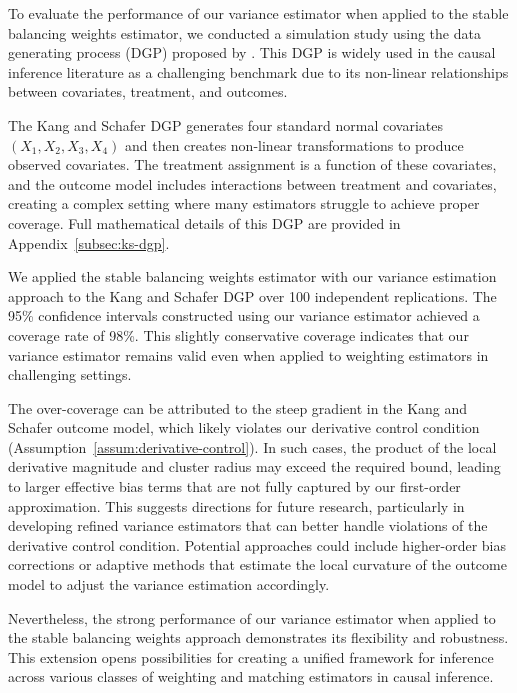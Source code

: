 \documentclass{mytemplate}
\begin{document}
To evaluate the performance of our variance estimator when applied to the stable balancing weights estimator, we conducted a simulation study using the data generating process (DGP) proposed by \cite{kang2007demystifying}. This DGP is widely used in the causal inference literature as a challenging benchmark due to its non-linear relationships between covariates, treatment, and outcomes.

The Kang and Schafer DGP generates four standard normal covariates $(X_1, X_2, X_3, X_4)$ and then creates non-linear transformations to produce observed covariates. The treatment assignment is a function of these covariates, and the outcome model includes interactions between treatment and covariates, creating a complex setting where many estimators struggle to achieve proper coverage. Full mathematical details of this DGP are provided in Appendix~\ref{subsec:ks-dgp}.


We applied the stable balancing weights estimator with our variance estimation approach to the Kang and Schafer DGP over 100 independent replications. The 95\% confidence intervals constructed using our variance estimator achieved a coverage rate of 98\%. This slightly conservative coverage indicates that our variance estimator remains valid even when applied to weighting estimators in challenging settings.

The over-coverage can be attributed to the steep gradient in the Kang and Schafer outcome model, which likely violates our derivative control condition (Assumption~\ref{assum:derivative-control}). In such cases, the product of the local derivative magnitude and cluster radius may exceed the required bound, leading to larger effective bias terms that are not fully captured by our first-order approximation. This suggests directions for future research, particularly in developing refined variance estimators that can better handle violations of the derivative control condition. Potential approaches could include higher-order bias corrections or adaptive methods that estimate the local curvature of the outcome model to adjust the variance estimation accordingly.

Nevertheless, the strong performance of our variance estimator when applied to the stable balancing weights approach demonstrates its flexibility and robustness. This extension opens possibilities for creating a unified framework for inference across various classes of weighting and matching estimators in causal inference.
\end{document}
